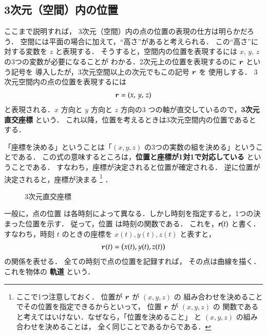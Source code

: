         \subsection{3次元（空間）内の位置}
            ここまで説明すれば，
            3次元（空間）内の点の位置の表現の仕方は明らかだろう．
            空間には平面の場合に加えて，“高さ”があると考えられる．
            この“高さ”に対する変数を $z$ と表現する．
            そうすると，空間内の位置を表現するには $x,\,y,\,z$ の3つの変数が必要になることが
            わかる．2次元上の位置を表現するのに $\boldsymbol{r}$ という記号を
            導入したが，3次元空間以上の次元でもこの記号 $\boldsymbol{r}$ を
            使用しする．
            3次元空間内の点の位置を表現するには
            \begin{align}
            \boldsymbol{r}=(x,\,y,\,z)
            \end{align}
            と表現される．$x$ 方向と $y$ 方向と $z$ 方向の3
            つの軸が直交しているので，\textbf{3次元直交座標} という．
            これ以降，位置を考えるときは3次元空間内の位置であるとする．

            「座標を決める」ということは「$\left( x, y, z \right)$ の3つの実数の組を決める」ということである．
            この式の意味するところは，\textbf{位置と座標が1対1で対応している} ということである．
            すなわち，座標が決定されると位置が確定される．
            逆に位置が決定されると，座標が決まる
                    \footnote{ここで1つ注意しておく．
                    位置が $\boldsymbol{r}$ が $\left( x  , y ,  z \right)$ の
                    組み合わせを決めることでその位置を指定できるからといって，
                    位置 $\boldsymbol{r}$ が $\left( x  , y ,  z \right)$ の
                    関数であると考えてはいけない．なぜなら，「位置を決めること」
                    と $\left( x  , y ,  z \right)$ の組み合わせを決めることは，
                    全く同じことであるからである．} ．
            \begin{figure}[hbt]
                \begin{center}
                    \caption{3次元直交座標}
                    \label{fig:zahyou}
                \end{center}
            \end{figure}

            一般に，点の位置 は各時刻によって異なる．しかし時刻を指定すると，1つの決まった位置を示す．
            従って，位置 は時刻の関数である．
            これを，$\textit{\textbf{r}\rm{(}$t$\rm{)}}$ と書く．
            すなわち，時刻 $t$ のときの座標を $x(t), y(t), z(t)$ と表すと，
                \begin{align}
                        \boldsymbol{r}(t) = \left( x(t), y(t), z(t) \right)
                \end{align}
            の関係を表せる．
            全ての時刻で点の位置を記録すれば，
            その点は曲線を描く．これを物体の \textbf{軌道} という．

